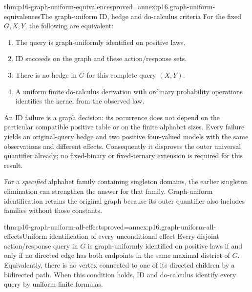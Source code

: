 \begin{hbtheorem}{thm:p16-graph-uniform-equivalences}{proved=annex:p16.graph-uniform-equivalences}{The graph-uniform ID, hedge and do-calculus criteria}
For the fixed \(G,X,Y\), the following are equivalent:
\begin{enumerate}
\item The query is graph-uniformly identified on positive laws.
\item ID succeeds on the graph and these action/response sets.
\item There is no hedge in \(G\) for this complete query \((X,Y)\).
\item A uniform finite do-calculus derivation with ordinary probability
      operations identifies the kernel from the observed law.
\end{enumerate}
An ID failure is a graph decision: its occurrence does not depend
on the particular compatible positive table or on the finite alphabet
sizes. Every failure yields an original-query hedge and two positive
four-valued models with the same observations and different effects.
Consequently it disproves the outer universal quantifier already;
no fixed-binary or fixed-ternary extension is required for this result.

For a \emph{specified} alphabet family containing singleton domains,
the earlier singleton elimination can strengthen the answer for that
family. Graph-uniform identification retains the original graph because
its outer quantifier also includes families without those constants.
\end{hbtheorem}

\begin{hbcorollary}{thm:p16-graph-uniform-all-effects}{proved=annex:p16.graph-uniform-all-effects}{Uniform identification of every unconditional effect}
Every disjoint action/response query in \(G\) is graph-uniformly
identified on positive laws if and only if no directed edge has both
endpoints in the same maximal district of \(G\). Equivalently,
there is no vertex connected to one of its directed children by a
bidirected path. When this condition holds, ID and do-calculus
identify every query by uniform finite formulas.
\end{hbcorollary}

